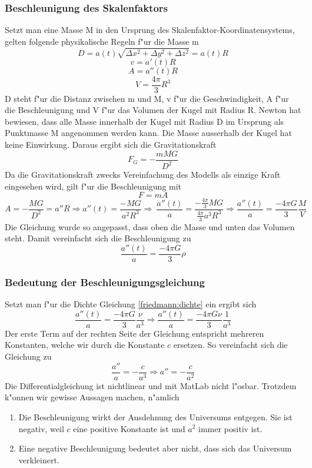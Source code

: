 \begin{refsection}
\subsubsection{Beschleunigung des Skalenfaktors}
Setzt man eine Masse M in den Ursprung des Skalenfaktor-Koordinatensystems, gelten folgende physikalische Regeln f"ur die Masse m 
\[D =  a(t) \sqrt{\Delta x^2 + \Delta y^2 + \Delta z^2}  = a(t) R\]
\[v = a'(t) R\]
\[A = a''(t) R\]
\[V = \frac{4 \pi }{3} R^3\]
D steht f"ur die Distanz zwischen m und M, v f"ur die Geschwindigkeit, A f"ur die Beschleunigung und V f"ur das Volumen der Kugel mit Radius R. Newton hat bewiesen, dass alle Masse innerhalb der Kugel mit Radius D im Ursprung als Punktmasse M angenommen werden kann. Die Masse ausserhalb der Kugel hat keine Einwirkung. Daraus ergibt sich die Gravitationskraft
\begin{equation}
F_G = -\frac{m M G}{D^2}
\end{equation}
Da die Gravitationskraft zwecks Vereinfachung des Modells als einzige Kraft eingesehen wird, gilt f"ur die Beschleunigung mit 
\[F = m A\]
\[A = - \frac{M G}{D^2} = a'' R \Rightarrow a''(t) = \frac{- M G}{a^2 R^3} \Rightarrow\ \frac{a''(t)}{a} = \frac{-\frac{4 \pi }{3} M G}{\frac{4 \pi}{3}a^3 R^3} \Rightarrow \frac{a''(t)}{a} = \frac{- 4 \pi G}{3} \frac{M}{V}\]
Die Gleichung wurde so angepasst, dass oben die Masse und unten das Volumen steht. Damit vereinfacht sich die Beschleunigung zu
\begin{equation}
\frac{a''(t)}{a} = \frac{- 4 \pi G}{3} \rho
\end{equation}
\subsubsection{Bedeutung der Beschleunigungsgleichung}
Setzt man f"ur die Dichte Gleichung \ref{friedmann:dichte} ein ergibt sich
\[\frac{a''(t)}{a} = \frac{- 4 \pi G}{3} \frac{\nu}{a^3} \Rightarrow \frac{a''(t)}{a} = \frac{- 4 \pi G \nu}{3} \frac{1}{a^3}\]
Der erste Term auf der rechten Seite der Gleichung entspricht mehreren Konstanten, welche wir durch die Konstante $c$ ersetzen. So vereinfacht sich die Gleichung zu
\[\frac{a''}{a} = -\frac{c}{a^3} \Rightarrow a'' = -\frac{c}{a^2}\]
Die Differentialgleichung ist nichtlinear und mit MatLab nicht l"osbar. Trotzdem k"onnen wir gewisse Aussagen machen, n"amlich
\begin{enumerate}
	\item Die Beschleunigung wirkt der Ausdehnung des Universums entgegen. Sie ist negativ, weil $c$ eine positive Konstante ist und $a^2$  immer positiv ist. 
	\item Eine negative Beschleunigung bedeutet aber nicht, dass sich das Universum verkleinert.
\end{enumerate}


\end{refsection}
